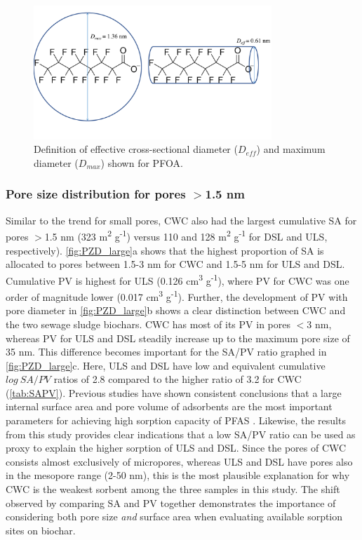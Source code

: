 \begin{figure}
    \centering
    \includegraphics[width=0.8\textwidth, trim={0 2cm 0 0},clip]{Diagrams/Molecular_size.pdf}
    \caption{Definition of effective cross-sectional diameter ($D_{eff}$) and maximum diameter ($D_{max}$) shown for PFOA.}
    \label{fig:molecularSize}
\end{figure}

\subsubsection{Pore size distribution for pores $>$1.5 nm}
Similar to the trend for small pores, CWC also had the largest cumulative SA for pores $>$1.5 nm (323 m\textsuperscript{2} g\textsuperscript{-1}) versus 110 and 128 m\textsuperscript{2} g\textsuperscript{-1} for DSL and ULS, respectively). \cref{fig:PZD_large}a shows that the highest proportion of SA is allocated to pores between 1.5-3 nm for CWC and 1.5-5 nm for ULS and DSL. Cumulative PV is highest for ULS (0.126 cm\textsuperscript{3} g\textsuperscript{-1}), where PV for CWC was one order of magnitude lower (0.017 cm\textsuperscript{3} g\textsuperscript{-1}). Further, the development of PV with pore diameter in \cref{fig:PZD_large}b shows a clear distinction between CWC and the two sewage sludge biochars. CWC has most of its PV in pores $<$3 nm, whereas PV for ULS and DSL steadily increase up to the maximum pore size of 35 nm. This difference becomes important for the SA/PV ratio graphed in \cref{fig:PZD_large}c. Here, ULS and DSL have low and equivalent cumulative $log~SA/PV$ ratios of 2.8 compared to the higher ratio of 3.2 for CWC (\cref{tab:SAPV}). Previous studies have shown consistent conclusions that a large internal surface area and pore volume of adsorbents are the most important parameters for achieving high sorption capacity of PFAS \citep{du2014adsorption,Sormo2021,Hale2016,ahmed2020per}. Likewise, the results from this study provides clear indications that a low SA/PV ratio can be used as proxy to explain the higher sorption of ULS and DSL. Since the pores of CWC consists almost exclusively of micropores, whereas ULS and DSL have pores also in the mesopore range (2-50 nm), this is the most plausible explanation for why CWC is the weakest sorbent among the three samples in this study. The shift observed by comparing SA and PV together demonstrates the importance of considering both pore size \textit{and} surface area when evaluating available sorption sites on biochar.


